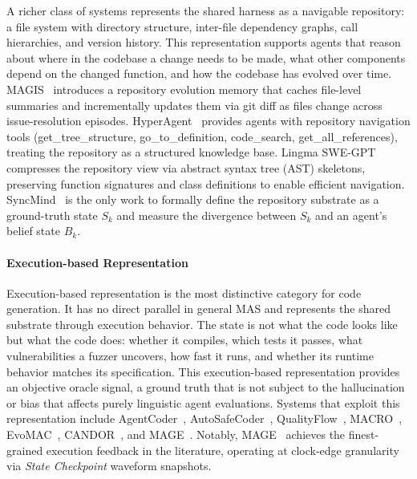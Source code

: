 \documentclass{llmxive}
\begin{document}
A richer class of systems represents the shared harness as a
navigable repository: a file system with directory structure,
inter-file dependency graphs, call hierarchies, and version
history. This representation supports agents that reason about
where in the codebase a change needs to be made, what other
components depend on the changed function, and how the codebase
has evolved over time. MAGIS~\cite{Tao2024Magis} introduces a
repository evolution memory that caches file-level summaries and
incrementally updates them via git diff as files change across
issue-resolution episodes. HyperAgent~\cite{Phan2024HyperAgent}
provides agents with repository navigation tools
(get\_tree\_structure, go\_to\_definition, code\_search,
get\_all\_references), treating the repository as a structured
knowledge base. Lingma SWE-GPT~\cite{Ma2024Lingma} compresses the
repository view via abstract syntax tree (AST) skeletons,
preserving function signatures and class definitions to enable
efficient navigation. SyncMind~\cite{Guo2025SyncMind} is the only
work to formally define the repository substrate as a ground-truth
state $S_k$ and measure the divergence between $S_k$ and an
agent's belief state $B_k$.

\paragraph{Execution-based Representation}

Execution-based representation is the most distinctive category
for code generation. It has no direct parallel in general MAS and
represents the shared substrate through execution behavior. The
state is not what the code looks like but what the code does:
whether it compiles, which tests it passes, what vulnerabilities
a fuzzer uncovers, how fast it runs, and whether its runtime
behavior matches its specification. This execution-based
representation provides an objective oracle signal, a ground
truth that is not subject to the hallucination or bias that
affects purely linguistic agent evaluations. Systems that exploit
this representation include
AgentCoder~\cite{huang2023agentcoder},
AutoSafeCoder~\cite{Nunez2024AutoSafeCoder},
QualityFlow~\cite{Hu2025QualityFlow},
MACRO~\cite{Rahman2025MACRO}, EvoMAC~\cite{Hu2025EvoMAC},
CANDOR~\cite{Xu2025Hallucination}, and
MAGE~\cite{Zhao2024MAGE}. Notably,
MAGE~\cite{Zhao2024MAGE} achieves the finest-grained execution
feedback in the literature, operating at clock-edge granularity
via \textit{State Checkpoint} waveform snapshots.
\end{document}
